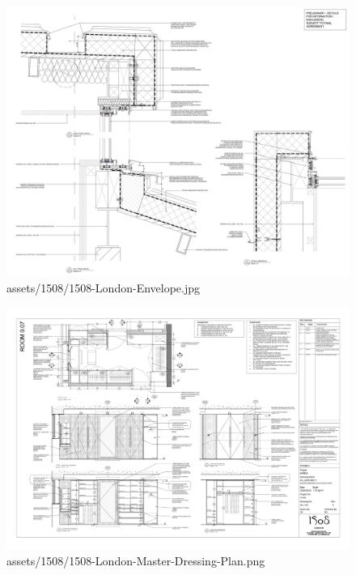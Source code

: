 \documentclass[
]{article}
\begin{document}
\begin{figure}[H]

{\centering \includegraphics{assets/1508/1508-London-Envelope.jpg}

}

\caption{assets/1508/1508-London-Envelope.jpg}

\end{figure}%
\begin{figure}[H]

{\centering \includegraphics{assets/1508/1508-London-Master-Dressing-Plan.png}

}

\caption{assets/1508/1508-London-Master-Dressing-Plan.png}

\end{figure}%
\end{document}
